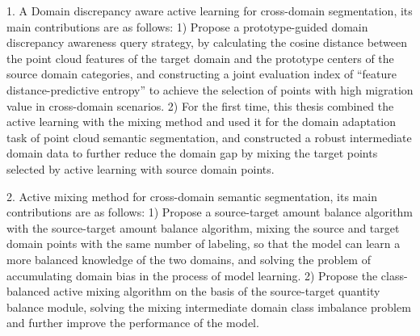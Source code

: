 1. A Domain discrepancy aware active learning for cross-domain segmentation, its main contributions are as follows: 1) Propose a prototype-guided domain discrepancy awareness query strategy, by calculating the cosine distance between the point cloud features of the target domain and the prototype centers of the source domain categories, and constructing a joint evaluation index of “feature distance-predictive entropy” to achieve the selection of points with high migration value in cross-domain scenarios. 2) For the first time, this thesis combined the active learning with the mixing method and used it for the domain adaptation task of point cloud semantic segmentation, and constructed a robust intermediate domain data to further reduce the domain gap by mixing the target points selected by active learning with source domain points.

2. Active mixing method for cross-domain semantic segmentation, its main contributions are as follows: 1) Propose a source-target amount balance algorithm with the source-target amount balance algorithm, mixing the source and target domain points with the same number of labeling, so that the model can learn a more balanced knowledge of the two domains, and solving the problem of accumulating domain bias in the process of model learning. 2) Propose the class-balanced active mixing algorithm on the basis of the source-target quantity balance module, solving the mixing intermediate domain class imbalance problem and further improve the performance of the model.

